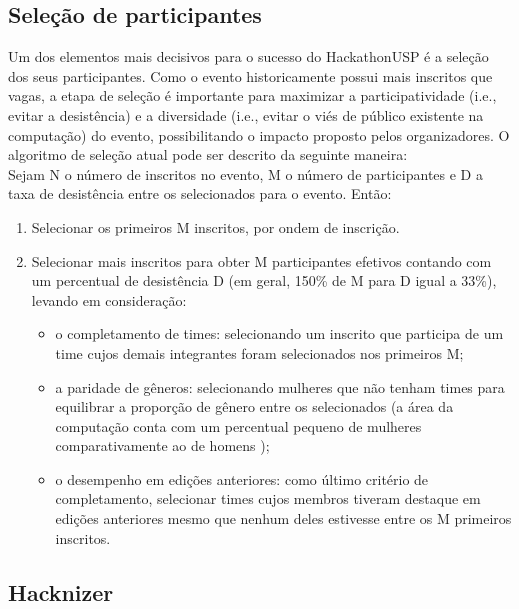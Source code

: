 \documentclass[10pt,twoside,a4paper]{article}
\begin{document}
  \subsection{Seleção de participantes}
    
    Um dos elementos mais decisivos para o sucesso do HackathonUSP é a seleção dos seus participantes. Como o evento historicamente possui mais inscritos que vagas, a etapa de seleção é importante para maximizar a participatividade (i.e., evitar a desistência) e a diversidade (i.e., evitar o viés de público existente na computação) do evento, possibilitando o impacto proposto pelos organizadores.
    O algoritmo de seleção atual pode ser descrito da seguinte maneira: \\
    
    
    Sejam N o número de inscritos no evento, M o número de participantes e D a taxa de desistência entre os selecionados para o evento. Então:
    
    \begin{enumerate}
      \item Selecionar os primeiros M inscritos, por ondem de inscrição.
     
      \item Selecionar mais inscritos para obter M participantes efetivos contando com um percentual de desistência D (em geral, 150\% de M para D igual a 33\%), levando em consideração: 
      
      \begin{itemize}
          \item o completamento de times: selecionando um inscrito que participa de um time cujos demais integrantes foram selecionados nos primeiros M;
          \item a paridade de gêneros: selecionando mulheres que não tenham times para equilibrar a proporção de gênero entre os selecionados (a área da computação conta com um percentual pequeno de mulheres comparativamente ao de homens \cite{Frenkel1990WomenComputing});
          \item o desempenho em edições anteriores: como último critério de completamento, selecionar times cujos membros tiveram destaque em edições anteriores mesmo que nenhum deles estivesse entre os M primeiros inscritos.
      \end{itemize}   
    \end{enumerate}
    
  \subsection{Hacknizer}
\end{document}
